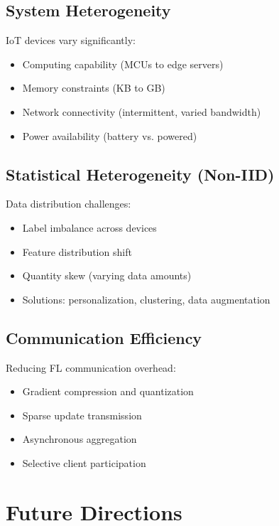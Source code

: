 \documentclass[12pt,a4paper]{article}
\begin{document}
\subsection{System Heterogeneity}

IoT devices vary significantly:
\begin{itemize}
    \item Computing capability (MCUs to edge servers)
    \item Memory constraints (KB to GB)
    \item Network connectivity (intermittent, varied bandwidth)
    \item Power availability (battery vs. powered)
\end{itemize}

\subsection{Statistical Heterogeneity (Non-IID)}

Data distribution challenges:
\begin{itemize}
    \item Label imbalance across devices
    \item Feature distribution shift
    \item Quantity skew (varying data amounts)
    \item Solutions: personalization, clustering, data augmentation
\end{itemize}

\subsection{Communication Efficiency}

Reducing FL communication overhead:
\begin{itemize}
    \item Gradient compression and quantization
    \item Sparse update transmission
    \item Asynchronous aggregation
    \item Selective client participation
\end{itemize}

\section{Future Directions}
\end{document}
